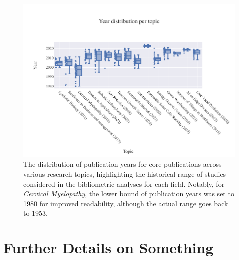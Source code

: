 \documentclass[%
  a4paper,fontsize=11pt,abstract=on,%
  twoside,BCOR=19mm,%
]{scrreprt}
\begin{document}
\begin{figure}
	\centering	
	\includegraphics{pics/year-distribution.pdf}
	\caption[Distribution of publication years per topic]{The distribution of publication years for core publications across various research topics, highlighting the historical range of studies considered in the bibliometric analyses for each field. Notably, for \textit{Cervical Myelopathy}, the lower bound of publication years was set to 1980 for improved readability, although the actual range goes back to 1953.}
	\label{fig:dataset-years}
\end{figure}
\section{Further Details on Something}
\lipsum



\printbibliography


\end{document}
